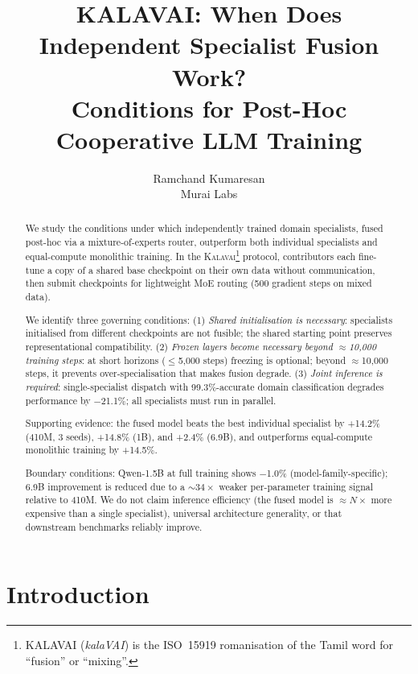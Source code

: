 \documentclass{article}
\title{KALAVAI: When Does Independent Specialist Fusion Work?\\
       Conditions for Post-Hoc Cooperative LLM Training}
\author{%
  Ramchand Kumaresan \\
  Murai Labs
}
\newcommand{\kalavai}{\textsc{Kalavai}\xspace}
\begin{document}
\maketitle

\begin{abstract}
We study the conditions under which independently trained domain specialists, fused post-hoc via a mixture-of-experts router, outperform both individual specialists and equal-compute monolithic training. In the \kalavai\footnote{KALAVAI (\textit{kalaVAI}) is the ISO~15919 romanisation of the Tamil word for ``fusion'' or ``mixing''.} protocol, contributors each fine-tune a copy of a shared base checkpoint on their own data without communication, then submit checkpoints for lightweight MoE routing (500 gradient steps on mixed data).

We identify three governing conditions: (1) \emph{Shared initialisation is necessary}: specialists initialised from different checkpoints are not fusible; the shared starting point preserves representational compatibility. (2) \emph{Frozen layers become necessary beyond $\approx$10,000 training steps}: at short horizons ($\leq$5,000 steps) freezing is optional; beyond $\approx$10,000 steps, it prevents over-specialisation that makes fusion degrade. (3) \emph{Joint inference is required}: single-specialist dispatch with 99.3\%-accurate domain classification degrades performance by $-$21.1\%; all specialists must run in parallel.

Supporting evidence: the fused model beats the best individual specialist by +14.2\% (410M, 3 seeds), +14.8\% (1B), and +2.4\% (6.9B), and outperforms equal-compute monolithic training by +14.5\%.

Boundary conditions: Qwen-1.5B at full training shows $-$1.0\% (model-family-specific); 6.9B improvement is reduced due to a ${\sim}34\times$ weaker per-parameter training signal relative to 410M. We do not claim inference efficiency (the fused model is ${\approx}N\times$ more expensive than a single specialist), universal architecture generality, or that downstream benchmarks reliably improve.
\end{abstract}

\section{Introduction}
\label{sec:intro}
\end{document}
